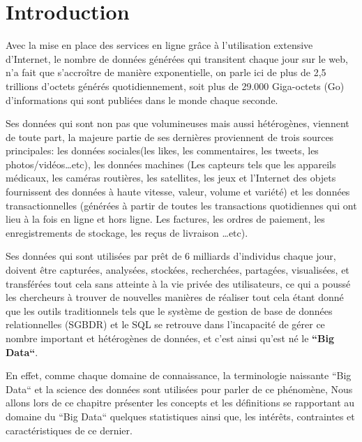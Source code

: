 \section*{Introduction}
Avec la mise en place des services en ligne grâce à l'utilisation extensive d'Internet, le nombre de données générées qui transitent chaque jour sur le web, n'a fait que s'accroître de manière exponentielle, on parle ici de plus de 2,5 trillions d'octets générés quotidiennement, soit plus de 29.000 Giga-octets (Go) d'informations qui sont publiées dans le monde chaque seconde.

Ses données qui sont non pas que volumineuses mais aussi hétérogènes, viennent de toute part, la majeure partie de ses dernières proviennent de trois sources principales: les données sociales(les likes, les commentaires, les tweets, les photos/vidéos…etc), les données machines (Les capteurs tels que les appareils médicaux, les caméras routières, les satellites, les jeux et l'Internet des objets fournissent des données à haute vitesse, valeur, volume et variété) et les données transactionnelles (générées à partir de toutes les transactions quotidiennes qui ont lieu à la fois en ligne et hors ligne. Les factures, les ordres de paiement, les enregistrements de stockage, les reçus de livraison …etc).

Ses données qui sont utilisées par prêt de 6 milliards d'individus chaque jour, doivent être capturées, analysées,  stockées, recherchées,  partagées, visualisées, et transférées tout cela sans atteinte à la vie privée des utilisateurs, ce qui a poussé les chercheurs à trouver de nouvelles manières de réaliser tout cela étant donné que les outils traditionnels tels que le système de gestion de base de données relationnelles (SGBDR) et le SQL se retrouve dans l'incapacité de gérer ce nombre important et hétérogènes de données, et c'est ainsi qu'est né le \textbf{“Big Data“}.

En effet, comme chaque domaine de connaissance, la terminologie naissante “Big Data“ et la science des données sont utilisées pour parler de ce phénomène, Nous allons lors de ce chapitre présenter les concepts et les définitions se rapportant au domaine du “Big Data“ quelques statistiques ainsi que, les intérêts, contraintes et caractéristiques de ce dernier.